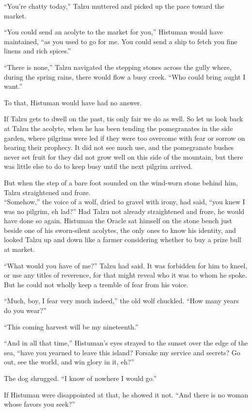``You're chatty today,'' Talzu muttered and picked up the pace toward the market.

``You could send an acolyte to the market for you,'' Histuman would have maintained, ``as you used to go for me. You could send a ship to fetch you fine linens and rich spices.''

``There is none,'' Talzu navigated the stepping stones across the gully where, during the spring rains, there would flow a busy creek. ``Who could bring aught I want.''

To that, Histuman would have had no answer.

If Talzu gets to dwell on the past, tis only fair we do as well. So let us look back at Talzu the acolyte, when he has been tending the pomegranates in the side garden, where pilgrims were led if they were too overcome with fear or sorrow on hearing their prophecy. It did not see much use, and the pomegranate bushes never set fruit for they did not grow well on this side of the mountain, but there was little else to do to keep busy until the next pilgrim arrived.

But when the step of a bare foot sounded on the wind-worn stone behind him, Talzu straightened and froze.\\
``Somehow,'' the voice of a wolf, dried to gravel with irony, had said, ``you knew I was no pilgrim, eh lad?'' Had Talzu not already straightened and froze, he would have done so again. Histuman the Oracle sat himself on the stone bench just beside one of his sworn-silent acolytes, the only ones to know his identity, and looked Talzu up and down like a farmer considering whether to buy a prize bull at market.

``What would you have of me?'' Talzu had said. It was forbidden for him to kneel, or use any titles of reverence, for that might reveal who it was to whom he spoke. But he could not wholly keep a tremble of fear from his voice.

``Much, boy, I fear very much indeed,'' the old wolf chuckled. ``How many years do you wear?''

``This coming harvest will be my nineteenth.''

``And in all that time,'' Histuman's eyes strayed to the sunset over the edge of the sea, ``have you yearned to leave this island? Forsake my service and secrets? Go out, see the world, and win glory in it, eh?''

The dog shrugged. ``I know of nowhere I would go.''

If Histuman were disappointed at that, he showed it not. ``And there is no woman whose favors you seek?''

